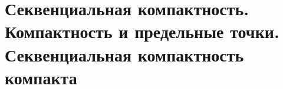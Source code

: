 \section{Секвенциальная компактность. Компактность и предельные точки. Секвенциальная компактность компакта}